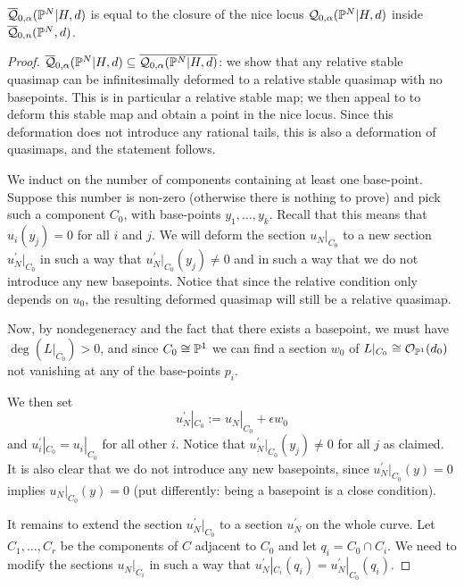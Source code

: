 \begin{lem}
$\overline{\mathcal Q}_{0,\alpha}(\mathbb P^N|H,d)$ is equal to the closure of the nice locus $\mathcal{Q}_{0,\alpha}(\mathbb P^N|H,d)$ inside $\overline{\mathcal Q}_{0,n}(\mathbb P^N,d)$. 
\end{lem}
\begin{proof}
$\overline{\mathcal Q}_{0,\alpha}(\mathbb P^N|H,d)\subseteq\overline{\mathcal Q_{0,\alpha}(\mathbb P^N|H,d)}$: we show that any relative stable quasimap can be infinitesimally deformed to a relative stable quasimap with no basepoints. This is in particular a relative stable map; we then appeal to \cite[Prop. 1.14]{Ga} to deform this stable map and obtain a point in the nice locus. Since this deformation does not introduce any rational tails, this is also a deformation of quasimaps, and the statement follows.

We induct on the number of components containing at least one base-point. Suppose this number is non-zero (otherwise there is nothing to prove) and pick such a component $C_0$, with base-points $y_1 ,\ldots, y_k$. Recall that this means that $u_i(y_j)=0$ for all $i$ and $j$. We will deform the section $u_N|_{C_0}$ to a new section $u_N^\prime|_{C_0}$ in such a way that $u_N^\prime|_{C_0}(y_j) \neq 0$ and in such a way that we do not introduce any new basepoints. Notice that since the relative condition only depends on $u_0$, the resulting deformed quasimap will still be a relative quasimap.

Now, by nondegeneracy and the fact that there exists a basepoint, we must have $\deg(L|_{C_0})>0$, and since $C_0 \cong \mathbb P^1$ we can find a section $w_0$ of $L|_{C_0} \cong \mathcal{O}_{\mathbb P^1}(d_0)$ not vanishing at any of the base-points $p_i$.

We then set
\begin{equation*} u_N^\prime|_{C_0} := u_N|_{C_0} + \epsilon w_0 \end{equation*}
and $u_i^\prime|_{C_0} = u_i|_{C_0}$ for all other $i$. Notice that $u_N^\prime|_{C_0}(y_j) \neq 0$ for all $j$ as claimed. It is also clear that we do not introduce any new basepoints, since $u_N^\prime|_{C_0}(y) = 0$ implies $u_N|_{C_0}(y)=0$ (put differently: being a basepoint is a close condition).

It remains to extend the section $u_N^\prime|_{C_0}$ to a section $u_N^\prime$ on the whole curve. Let $C_1, \ldots, C_r$ be the components of $C$ adjacent to $C_0$ and let $q_i = C_0 \cap C_i$. We need to modify the sections $u_N|_{C_i}$ in such a way that $u_N^\prime|_{C_i}(q_i) = u_N^\prime|_{C_0}(q_i)$.


\end{proof}
